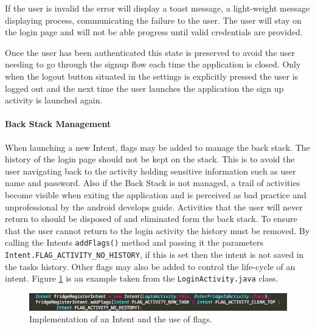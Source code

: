 \documentclass[a4paper, 11pt]{article}
\begin{document}
\vspace{\baselineskip}


If the user is invalid the error will display a toast message, a light-weight message displaying process, communicating the failure to the user. The user will stay on the login page and will not be able progress until valid credentials are provided. 

Once the user has been authenticated this state is preserved to avoid the user needing to go through the signup flow each time the application is closed. Only when the logout button situated in the settings is explicitly pressed the user is logged out and the next time the user launches the application the sign up activity is launched again. 


\paragraph{Back Stack Management}
When launching a new Intent, flags may be added to manage the back stack. The history of the login page should not be kept on the stack. This is to avoid the user navigating back to the activity holding sensitive information such as user name and password. Also if the Back Stack is not managed, a trail of activities become visible when exiting the application and is perceived as bad practice and unprofessional by the android develops guide.\cite{android} Activities that the user will never return to should be disposed of and eliminated form the back stack. To ensure that the user cannot return to the login activity the history must be removed. By calling the Intents \texttt{addFlags()} method and passing it the parameters \texttt{Intent.FLAG\_ACTIVITY\_NO\_HISTORY}, if this is set then the intent is not saved in the tasks history. Other flags may also be added to control the life-cycle of an intent. Figure \ref{fig:intent} is an example taken from the \texttt{LoginActivity.java} class. 

\vspace{\baselineskip}

\begin{figure}[h]
\centering
\includegraphics[width=\textwidth]{intent}
\caption{Implementation of an Intent and the use of flags.} \label{fig:intent}
\end{figure}

\vspace{\baselineskip}
\end{document}
